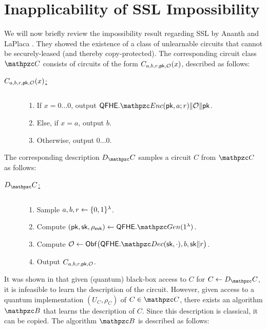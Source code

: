 \section{Inapplicability of SSL Impossibility}

We will now briefly review the impossibility result regarding SSL
by Ananth and LaPlaca \cite{EC:AnaLaP21}. They showed the existence
of a class of unlearnable circuits that cannot be securely-leased
(and thereby copy-protected). The corresponding circuit class $\qC$
consists of circuits of the form $C_{a, b, r, \mathsf{pk}, \mathcal{O}}(x)$,
described as follows:

\begin{description}
\item[\underline{$C_{a, b, r, \mathsf{pk}, \mathcal{O}}(x)$:}] $ $
\begin{enumerate}
\item If $x = 0 \ldots 0$, output $\QFHE.\qEnc(\pk, a; r) \| \calO
\| \pk$.
\item Else, if $x = a$, output $b$.
\item Otherwise, output $0 \ldots 0$.
\end{enumerate}
\end{description}

The corresponding description $D_\qC$ samples a circuit $C$ from
$\qC$ as follows:
\begin{description}
\item[\underline{$D_\qC$:}] $ $
\begin{enumerate}
\item Sample $a, b, r \leftarrow \{0,1\}^\lambda$.
\item Compute $(\pk,\sk,\rho_\evk) \gets \QFHE.\qGen(1^\secp)$.
\item Compute $\calO \gets \Obf \big(\QFHE.\qDec(\sk, \cdot), b, 
\sk \| r\big)$.
\item Output $C_{a, b, r, \mathsf{pk}, \mathcal{O}}$.
\end{enumerate}
\end{description}

It was shown in \cite{EC:AnaLaP21} that given (quantum) black-box
access to $C$ for $C \gets D_\qC$, it is infeasible to learn the
description of the circuit. However, given access to a quantum
implementation $(U_C, \rho_C)$ of $C \in \qC$, there exists an
algorithm $\qB$ that learns the description of $C$. Since this
description is classical, it can be copied. The algorithm $\qB$ is
described as follows:

